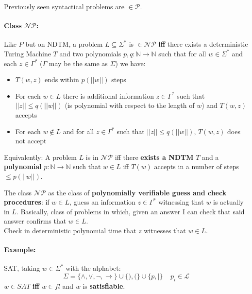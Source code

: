 \documentclass[11pt]{article}
\begin{document}
	Previously seen syntactical problems are $\in \mathcal{P}$.\\
	
	
	\vfill
	
	\paragraph{Class $\mathcal{NP}$:} Like $P$ but on NDTM, a problem $L \subseteq \Sigma^\ast$ is $\in \mathcal{NP}$ \textbf{iff} there exists a deterministic Turing Machine $T$ and two polynomials $p,q:\mathbb{N} \rightarrow \mathbb{N}$ such that for all $w \in \Sigma^\ast$ and each $z \in \Gamma^\ast$ ($\Gamma$ may be the same as $\Sigma$) we have: 
	\begin{itemize}
		\item $T(w,z)$ ends within $p(||w||)$ steps
		\item For each $w \in L$ there is additional information $z \in \Gamma^\ast$ such that $||z|| \leq q (||w||)$ (is polynomial with respect to the length of $w$) and $T(w,z)$ accepts
		\item For each $w \notin L$ and for all $z \in \Gamma^\ast$ such that $||z|| \leq q(||w||)$, $T(w,z)$ does not accept
	\end{itemize}
	
	Equivalently: A problem $L$ is in $\mathcal{NP}$ iff there \textbf{exists a NDTM} $T$ and a \textbf{polynomial} $p: \mathbb{N} \rightarrow \mathbb{N}$ such that $w \in L$ iff $T(w)$ accepts in a number of steps $\leq p(||w||)$.\\
	
	\newpage
	
	The class $\mathcal{NP}$ as the class of \textbf{polynomially verifiable guess and check procedures}: if $w \in L$, guess an information $z \in \Gamma^\ast$ witnessing that $w$ is actually in $L$. Basically, class of problems in which, given an answer I can check that said answer confirms that $w \in L$.\\
	Check in deterministic polynomial time that $z$ witnesses that $w \in L$.\\
	
	\paragraph{Example:} SAT, taking $w \in \Sigma^\ast$ with the alphabet:
	$$ \Sigma = \{\wedge, \vee, \neg, \rightarrow\} \cup \{),(\} \cup \{p, |\} \;\;\;\; p_i \in \mathcal{L} $$
	$w \in SAT$ \textbf{iff} $w \in fl$ and $w$ is \textbf{satisfiable}.\\
	
\end{document}
